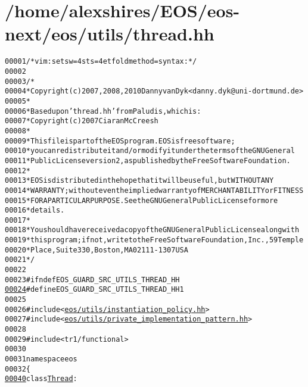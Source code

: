 \hypertarget{thread_8hh_source}{
\section{/home/alexshires/EOS/eos-\/next/eos/utils/thread.hh}
}


\begin{footnotesize}\begin{alltt}
00001 \textcolor{comment}{/* vim: set sw=4 sts=4 et foldmethod=syntax : */}
00002 
00003 \textcolor{comment}{/*}
00004 \textcolor{comment}{ * Copyright (c) 2007, 2008, 2010 Danny van Dyk <danny.dyk@uni-dortmund.de>}
00005 \textcolor{comment}{ *}
00006 \textcolor{comment}{ * Based upon 'thread.hh' from Paludis, which is:}
00007 \textcolor{comment}{ *     Copyright (c) 2007 Ciaran McCreesh}
00008 \textcolor{comment}{ *}
00009 \textcolor{comment}{ * This file is part of the EOS program. EOS is free software;}
00010 \textcolor{comment}{ * you can redistribute it and/or modify it under the terms of the GNU General}
00011 \textcolor{comment}{ * Public License version 2, as published by the Free Software Foundation.}
00012 \textcolor{comment}{ *}
00013 \textcolor{comment}{ * EOS is distributed in the hope that it will be useful, but WITHOUT ANY}
00014 \textcolor{comment}{ * WARRANTY; without even the implied warranty of MERCHANTABILITY or FITNESS}
00015 \textcolor{comment}{ * FOR A PARTICULAR PURPOSE.  See the GNU General Public License for more}
00016 \textcolor{comment}{ * details.}
00017 \textcolor{comment}{ *}
00018 \textcolor{comment}{ * You should have received a copy of the GNU General Public License along with}
00019 \textcolor{comment}{ * this program; if not, write to the Free Software Foundation, Inc., 59 Temple}
00020 \textcolor{comment}{ * Place, Suite 330, Boston, MA  02111-1307  USA}
00021 \textcolor{comment}{ */}
00022 
00023 \textcolor{preprocessor}{#ifndef EOS\_GUARD\_SRC\_UTILS\_THREAD\_HH}
\hypertarget{thread_8hh_source_l00024}{}\hyperlink{thread_8hh_a2d7df5267d0afb72b9435a3e2ba9d252}{00024} \textcolor{preprocessor}{}\textcolor{preprocessor}{#define EOS\_GUARD\_SRC\_UTILS\_THREAD\_HH 1}
00025 \textcolor{preprocessor}{}
00026 \textcolor{preprocessor}{#include <\hyperlink{instantiation__policy_8hh}{eos/utils/instantiation_policy.hh}>}
00027 \textcolor{preprocessor}{#include <\hyperlink{private__implementation__pattern_8hh}{eos/utils/private_implementation_pattern.hh}>}
00028 
00029 \textcolor{preprocessor}{#include <tr1/functional>}
00030 
00031 \textcolor{keyword}{namespace }eos
00032 \{
\hypertarget{thread_8hh_source_l00040}{}\hyperlink{classeos_1_1Thread}{00040}     \textcolor{keyword}{class }\hyperlink{classeos_1_1Thread}{Thread} :

\end{alltt}
\end{footnotesize}
